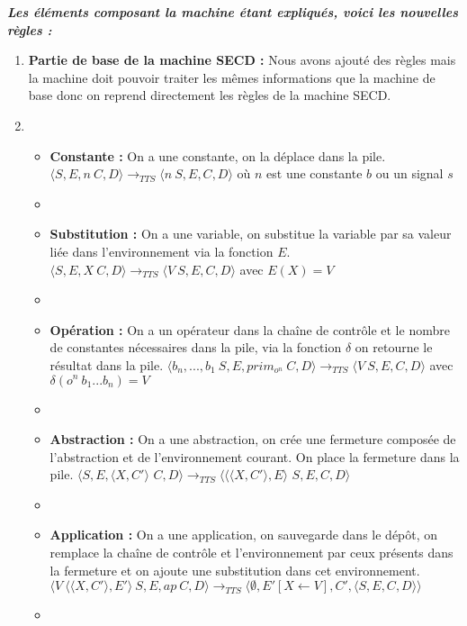\documentclass[10pt,a4paper]{report}
\begin{document}
	\bigbreak
	\bigbreak
	
	
	
	
	\textbf{\textit{Les éléments composant la machine étant expliqués, voici les nouvelles règles :}}
	\smallbreak
	\begin{enumerate}
		\item[] \textbf{Partie de base de la machine SECD :} Nous avons ajouté des règles mais la machine doit pouvoir traiter les mêmes informations que la machine de base donc on reprend directement les règles de la machine SECD. 
		\item[]
		\begin{itemize}
			\item[] \textbf{Constante :} On a une constante, on la déplace dans la pile.
			\smallbreak
			$\langle S,E,n~C,D\rangle 
			\longrightarrow_{TTS} 
			\langle n~S,E,C,D\rangle$ où $n$ est une constante $b$ ou un signal $s$
			\item[]
			
			\item[] \textbf{Substitution :} On a une variable, on substitue la variable par sa valeur liée dans l'environnement via la fonction $E$.
			\smallbreak
			$\langle S,E,X~C,D\rangle
			\longrightarrow_{TTS} 
			\langle V~S,E,C,D\rangle$ avec $E(X) = V$
			\item[]
			
			\item[] \textbf{Opération :} On a un opérateur dans la chaîne de contrôle et le nombre de constantes nécessaires dans la pile, via la fonction $\delta$ on retourne le résultat dans la pile.
			\smallbreak
			$\langle b_{n},...,b_{1}~S,E,prim_{o^{n}}~C,D\rangle
			\longrightarrow_{TTS} 
			\langle V~S,E,C,D\rangle$ avec $\delta(o^{n}~b_{1}...b_{n}) = V$
			\item[]
			
			\item[]  \textbf{Abstraction :} On a une abstraction, on crée une fermeture composée de l'abstraction et de l'environnement courant. On place la fermeture dans la pile.
			\smallbreak
			$\langle S,E,\langle X,C'\rangle$ $C,D\rangle
			\longrightarrow_{TTS} 
			\langle \langle\langle X,C'\rangle,E\rangle$ $S,E,C,D\rangle$
			\item[]
			
			\item[]  \textbf{Application :} On a une application, on sauvegarde dans le dépôt, on remplace la chaîne de contrôle et l'environnement par ceux présents dans la fermeture et on ajoute une substitution dans cet environnement.
			\smallbreak
			$\langle V~\langle\langle X,C'\rangle,E'\rangle~S,E,ap~C,D\rangle
			\longrightarrow_{TTS} 
			\langle \emptyset,E'[X \leftarrow V],C',\langle S,E,C,D\rangle\rangle$
			\item[] 
			

\end{itemize}
\end{enumerate}
\end{document}
